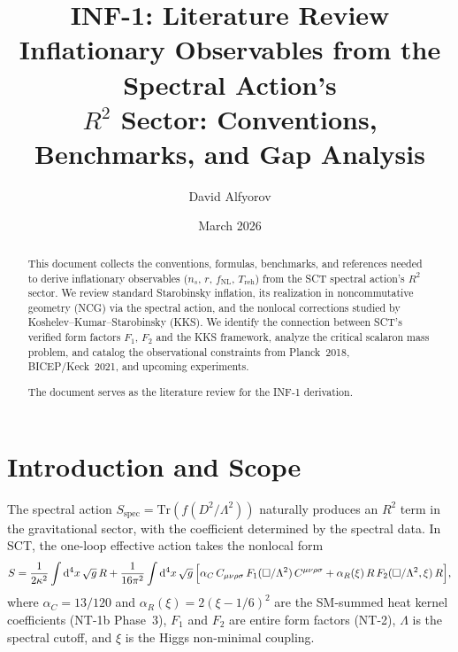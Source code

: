 \documentclass[11pt,a4paper]{article}
\title{INF-1: Literature Review\\[6pt]
\large Inflationary Observables from the Spectral Action's\\
$R^2$ Sector: Conventions, Benchmarks, and Gap Analysis}
\author{David Alfyorov}
\date{March 2026}
\renewcommand{\dd}{\mathrm{d}}
\theoremstyle{plain}
\theoremstyle{definition}
\begin{document}
\maketitle

\begin{center}
\end{center}

\begin{abstract}
This document collects the conventions, formulas, benchmarks, and
references needed to derive inflationary observables ($n_s$, $r$,
$f_{\mathrm{NL}}$, $T_{\mathrm{reh}}$) from the SCT spectral action's
$R^2$ sector. We review standard Starobinsky inflation, its realization
in noncommutative geometry (NCG) via the spectral action, and the
nonlocal corrections studied by Koshelev--Kumar--Starobinsky (KKS).
We identify the connection between SCT's verified form factors
$F_1$, $F_2$ and the KKS framework, analyze the critical scalaron mass
problem, and catalog the observational constraints from Planck~2018,
BICEP/Keck~2021, and upcoming experiments.

The document serves as the literature review for the INF-1 derivation.
\end{abstract}

\tableofcontents

\section{Introduction and Scope}\label{sec:intro}

The spectral action $S_{\mathrm{spec}} = \mathrm{Tr}(f(D^2/\Lambda^2))$
naturally produces an $R^2$ term in the gravitational sector, with the
coefficient determined by the spectral data. In SCT, the one-loop
effective action takes the nonlocal form
\begin{equation}\label{eq:sct-action}
  S = \frac{1}{2\kappa^2}\int \dd^4 x\,\sqrt{g}\,R
  + \frac{1}{16\pi^2}\int \dd^4 x\,\sqrt{g}\,
  \Bigl[\alpha_C\,C_{\mu\nu\rho\sigma}\,F_1(\Box/\Lambda^2)\,
  C^{\mu\nu\rho\sigma}
  + \alpha_R(\xi)\,R\,F_2(\Box/\Lambda^2,\xi)\,R\Bigr],
\end{equation}
where $\alpha_C = 13/120$ and $\alpha_R(\xi) = 2(\xi - 1/6)^2$ are the
SM-summed heat kernel coefficients (NT-1b Phase~3), $F_1$ and $F_2$ are
entire form factors (NT-2), $\Lambda$ is the spectral cutoff, and
$\xi$ is the Higgs non-minimal coupling.
\end{document}
